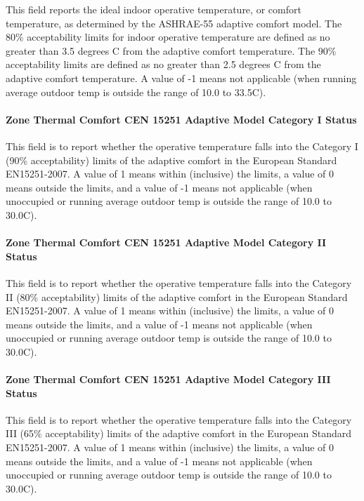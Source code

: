 This field reports the ideal indoor operative temperature, or comfort temperature, as determined by the ASHRAE-55 adaptive comfort model. The 80\% acceptability limits for indoor operative temperature are defined as no greater than 3.5 degrees C from the adaptive comfort temperature. The 90\% acceptability limits are defined as no greater than 2.5 degrees C from the adaptive comfort temperature. A value of -1 means not applicable (when running average outdoor temp is outside the range of 10.0 to 33.5C).

\paragraph{Zone Thermal Comfort CEN 15251 Adaptive Model Category I Status}\label{zone-thermal-comfort-cen-15251-adaptive-model-category-i-status}

This field is to report whether the operative temperature falls into the Category I (90\% acceptability) limits of the adaptive comfort in the European Standard EN15251-2007. A value of 1 means within (inclusive) the limits, a value of 0 means outside the limits, and a value of -1 means not applicable (when unoccupied or running average outdoor temp is outside the range of 10.0 to 30.0C).

\paragraph{Zone Thermal Comfort CEN 15251 Adaptive Model Category II Status}\label{zone-thermal-comfort-cen-15251-adaptive-model-category-ii-status}

This field is to report whether the operative temperature falls into the Category II (80\% acceptability) limits of the adaptive comfort in the European Standard EN15251-2007. A value of 1 means within (inclusive) the limits, a value of 0 means outside the limits, and a value of -1 means not applicable (when unoccupied or running average outdoor temp is outside the range of 10.0 to 30.0C).

\paragraph{Zone Thermal Comfort CEN 15251 Adaptive Model Category III Status}\label{zone-thermal-comfort-cen-15251-adaptive-model-category-iii-status}

This field is to report whether the operative temperature falls into the Category III (65\% acceptability) limits of the adaptive comfort in the European Standard EN15251-2007. A value of 1 means within (inclusive) the limits, a value of 0 means outside the limits, and a value of -1 means not applicable (when unoccupied or running average outdoor temp is outside the range of 10.0 to 30.0C).

